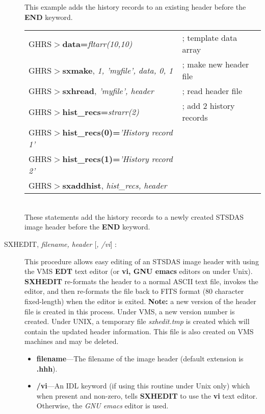 \begin{description}
\noindent
This example adds the history records to an existing header before the {\bf
END} keyword.\\

\begin{tabular}{ll}
GHRS$>${\bf data=}{\it fltarr(10,10)} & ; template data array\\
GHRS$>${\bf sxmake}, {\it 1, 'myfile', data, 0, 1} & ; make new header file\\
GHRS$>${\bf sxhread}, {\it 'myfile', header} & ; read header file\\
GHRS$>${\bf hist\_recs=}{\it strarr(2)} & ; add 2 history records\\
GHRS$>${\bf hist\_recs(0)=}{\it 'History record 1'} & \\
GHRS$>${\bf hist\_recs(1)=}{\it 'History record 2'} & \\
GHRS$>${\bf sxaddhist}, {\it hist\_recs, header} & \\
\end{tabular}\\

\noindent
These statements add the history records to a newly created STSDAS image
header before the {\bf END} keyword.

\item [SXHEDIT, {\it filename, header $[$, /vi$]$} :] 

This procedure allows easy editing of an STSDAS image header with using the VMS {\bf EDT} text 
editor (or {\bf vi, GNU emacs} editors on under Unix). {\bf SXHEDIT} re-formats the 
header to a normal ASCII text file, invokes the editor, and then re-formats 
the file back to FITS format (80 character fixed-length) when the editor is 
exited.  {\bf Note:} a new version of the header file is created in this 
process.  Under VMS, a new version number is created.  Under UNIX, a temporary 
file {\it sxhedit.tmp} is created which will contain the updated header 
information.  This file is also created on VMS machines and may be deleted.

\begin{itemize}

\item {\bf filename}---The filename of the image header (default extension is 
{\bf .hhh}).

\item {\bf /vi}---An IDL keyword (if using this routine under Unix only) 
which when present and non-zero, tells {\bf SXHEDIT} to use the
{\bf vi} text editor. Otherwise, the {\it GNU emacs} editor is used. 


\end{itemize}
\end{description}
